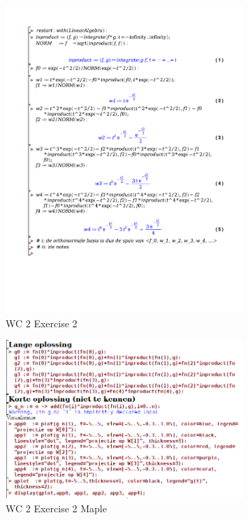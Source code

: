 \documentclass[a4paper]{report}
\begin{document}
\begin{figure}[H]
	\centering
	\includegraphics[width=0.8\textwidth]{exercises/wc_2_ex_2.pdf}
	\caption{WC 2 Exercise 2}
	\label{fig:wc_2_ex_2}
\end{figure}

\begin{figure}[H]
	\centering
	\includegraphics[width=0.8\textwidth]{assets/wc_2_ex_2_maple.png}
	\caption{WC 2 Exercise 2 Maple}
	\label{fig:wc_2_ex_2_maple}
\end{figure}
\end{document}
